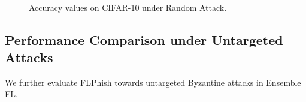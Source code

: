 \documentclass[journal]{IEEEtran}
\begin{document}
  \begin{figure}[!htp]
    \centering
    \\
    \caption{Accuracy values on CIFAR-10 under Random Attack.}
    \label{fig_table_cifar_random}
    \vspace{0.2in}
  \end{figure}





  \subsection{{Performance Comparison under Untargeted Attacks}} We further evaluate FLPhish towards untargeted Byzantine attacks in Ensemble FL.
  

  
\end{document}
